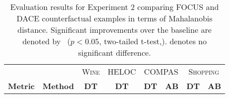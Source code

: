 \begin{table*}[h!]
\centering
\caption{Evaluation results for Experiment 2 comparing FOCUS and DACE counterfactual examples in terms of Mahalanobis distance. Significant improvements over the baseline are denoted by \dubbelneer\ ($p < 0.05$, two-tailed t-test,). 
\notsig{} denotes no significant difference.}
\begin{tabular}{ll@{}rrrrrr}
\toprule
                &                            & \multicolumn{1}{c}{\textsc{Wine}} & \multicolumn{1}{c}{\textsc{HELOC}} & \multicolumn{2}{c}{\textsc{COMPAS}}                               & \multicolumn{2}{c}{\textsc{Shopping}}                             \\
                \cmidrule(r){3-3}\cmidrule(r){4-4}\cmidrule(r){5-6}\cmidrule{7-8}
\textbf{Metric} & \textbf{Method}            & \multicolumn{1}{c}{\textbf{DT}}   & \multicolumn{1}{c}{\textbf{DT}}    & \multicolumn{1}{c}{\textbf{DT}} & \multicolumn{1}{c}{\textbf{AB}} & \multicolumn{1}{c}{\textbf{DT}} & \multicolumn{1}{c}{\textbf{AB}} \\ \midrule



\end{tabular}
\end{table*}
